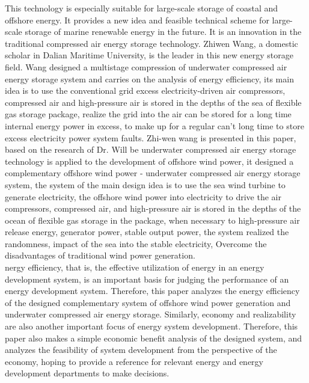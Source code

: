 \documentclass[journal,onecolumn]{IEEEtran}
\begin{document}
This technology is especially suitable for large-scale storage of coastal and offshore energy. It provides a new idea and feasible technical scheme for large-scale storage of marine renewable energy in the future. It is an innovation in the traditional compressed air energy storage technology. Zhiwen Wang, a domestic scholar in Dalian Maritime University, is the leader in this new energy storage field. Wang designed a multistage compression of underwater compressed air energy storage system and carries on the analysis of energy efficiency, its main idea is to use the conventional grid excess electricity-driven air compressors, compressed air and high-pressure air is stored in the depths of the sea of flexible gas storage package, realize the grid into the air can be stored for a long time internal energy power in excess, to make up for a regular can't long time to store excess electricity power system faults. Zhi-wen wang is presented in this paper, based on the research of Dr. Will be underwater compressed air energy storage technology is applied to the development of offshore wind power, it designed a complementary offshore wind power - underwater compressed air energy storage system, the system of the main design idea is to use the sea wind turbine to generate electricity, the offshore wind power into electricity to drive the air compressors, compressed air, and high-pressure air is stored in the depths of the ocean of flexible gas storage in the package, when necessary to high-pressure air release energy, generator power, stable output power, the system realized the randomness, impact of the sea into the stable electricity, Overcome the disadvantages of traditional wind power generation.\\

nergy efficiency, that is, the effective utilization of energy in an energy development system, is an important basis for judging the performance of an energy development system. Therefore, this paper analyzes the energy efficiency of the designed complementary system of offshore wind power generation and underwater compressed air energy storage. Similarly, economy and realizability are also another important focus of energy system development. Therefore, this paper also makes a simple economic benefit analysis of the designed system, and analyzes the feasibility of system development from the perspective of the economy, hoping to provide a reference for relevant energy and energy development departments to make decisions.\\
\end{document}
